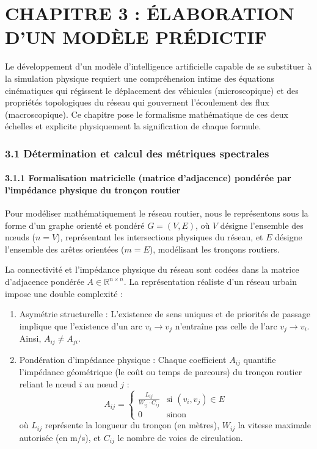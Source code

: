 \documentclass[10pt, a4paper]{article}
\providecommand{\tightlist}{}
\begin{document}
\newpage

\section{CHAPITRE 3 : ÉLABORATION D'UN MODÈLE
PRÉDICTIF}\label{chapitre-3-uxe9laboration-dun-moduxe8le-pruxe9dictif}

Le développement d'un modèle d'intelligence artificielle capable de se
substituer à la simulation physique requiert une compréhension intime
des équations cinématiques qui régissent le déplacement des véhicules
(microscopique) et des propriétés topologiques du réseau qui gouvernent
l'écoulement des flux (macroscopique). Ce chapitre pose le formalisme
mathématique de ces deux échelles et explicite physiquement la
signification de chaque formule.

\subsubsection{3.1 Détermination et calcul des métriques
spectrales}\label{duxe9termination-et-calcul-des-muxe9triques-spectrales}

\paragraph{3.1.1 Formalisation matricielle (matrice d'adjacence)
pondérée par l'impédance physique du tronçon
routier}\label{formalisation-matricielle-matrice-dadjacence-ponduxe9ruxe9e-par-limpuxe9dance-physique-du-tronuxe7on-routier}

Pour modéliser mathématiquement le réseau routier, nous le représentons
sous la forme d'un graphe orienté et pondéré \(G = (V, E)\), où \(V\)
désigne l'ensemble des nœuds (\(n = V\)), représentant les intersections
physiques du réseau, et \(E\) désigne l'ensemble des arêtes orientées
(\(m = E\)), modélisant les tronçons routiers.

La connectivité et l'impédance physique du réseau sont codées dans la
matrice d'adjacence pondérée \(A \in \mathbb{R}^{n \times n}\). La
représentation réaliste d'un réseau urbain impose une double complexité
:

\begin{enumerate}
\def\labelenumi{\arabic{enumi}.}
\tightlist
\item
  Asymétrie structurelle : L'existence de sens uniques et de priorités
  de passage implique que l'existence d'un arc \(v_i \to v_j\)
  n'entraîne pas celle de l'arc \(v_j \to v_i\). Ainsi,
  \(A_{ij} \neq A_{ji}\).
\item
  Pondération d'impédance physique : Chaque coefficient \(A_{ij}\)
  quantifie l'impédance géométrique (le coût ou temps de parcours) du
  tronçon routier reliant le nœud \(i\) au nœud \(j\) :
  \[A_{ij} = \begin{cases} \frac{L_{ij}}{W_{ij} \cdot C_{ij}} & \text{si } (v_i, v_j) \in E \\ 0 & \text{sinon} \end{cases}\]
  où \(L_{ij}\) représente la longueur du tronçon (en mètres),
  \(W_{ij}\) la vitesse maximale autorisée (en m/s), et \(C_{ij}\) le
  nombre de voies de circulation.
\end{enumerate}
\end{document}
